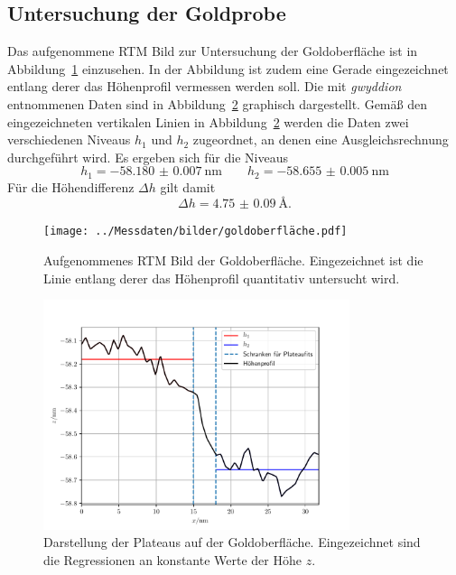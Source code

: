 \subsection{Untersuchung der Goldprobe}
Das aufgenommene RTM Bild zur Untersuchung der Goldoberfläche ist in Abbildung~\ref{fig: au} einzusehen.
In der Abbildung ist zudem eine Gerade eingezeichnet entlang derer das Höhenprofil vermessen werden soll.
Die mit \emph{gwyddion} entnommenen Daten sind in Abbildung~\ref{fig: höhenprofil}
graphisch dargestellt. Gemäß den eingezeichneten vertikalen Linien
in Abbildung~\ref{fig: höhenprofil} werden die Daten zwei verschiedenen
Niveaus $h_1$ und $h_2$ zugeordnet, an denen eine Ausgleichsrechnung durchgeführt wird. Es ergeben sich für die
Niveaus
\begin{equation}
  h_1 = \SI{-58.180(7)}{\nano\meter} \qquad h_2 = \SI{-58.655(5)}{\nano\meter}
\end{equation}
Für die Höhendifferenz $\Delta h$ gilt damit
\begin{equation}
  \Delta h = \SI{4.75(9)}{\angstrom}.
\end{equation}
\begin{figure}
  \centering
  \texttt{[image: ../Messdaten/bilder/goldoberfläche.pdf]}
  \caption{Aufgenommenes RTM Bild der Goldoberfläche. Eingezeichnet ist die Linie entlang derer
  das Höhenprofil quantitativ untersucht wird.}
  \label{fig: au}
\end{figure}
\begin{figure}
  \centering
  \includegraphics[width = 0.8\textwidth]{../Messdaten/bilder/au_plateau.pdf}
  \caption{Darstellung der Plateaus auf der Goldoberfläche. Eingezeichnet sind die Regressionen an
  konstante Werte der Höhe $z$.}
  \label{fig: höhenprofil}
\end{figure}
